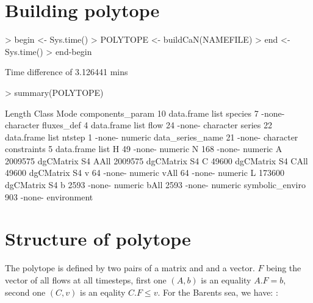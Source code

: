 \documentclass{article}
\begin{document}
\section{Building polytope}

\begin{Schunk}
\begin{Sinput}
> begin <- Sys.time()
> POLYTOPE <- buildCaN(NAMEFILE)
> end <- Sys.time()
> end-begin
\end{Sinput}
\begin{Soutput}
Time difference of 3.126441 mins
\end{Soutput}
\begin{Sinput}
> summary(POLYTOPE)
\end{Sinput}
\begin{Soutput}
                 Length  Class      Mode       
components_param      10 data.frame list       
species                7 -none-     character  
fluxes_def             4 data.frame list       
flow                  24 -none-     character  
series                22 data.frame list       
ntstep                 1 -none-     numeric    
data_series_name      21 -none-     character  
constraints            5 data.frame list       
H                     49 -none-     numeric    
N                    168 -none-     numeric    
A                2009575 dgCMatrix  S4         
AAll             2009575 dgCMatrix  S4         
C                  49600 dgCMatrix  S4         
CAll               49600 dgCMatrix  S4         
v                     64 -none-     numeric    
vAll                  64 -none-     numeric    
L                 173600 dgCMatrix  S4         
b                   2593 -none-     numeric    
bAll                2593 -none-     numeric    
symbolic_enviro      903 -none-     environment
\end{Soutput}
\end{Schunk}

\section{Structure of polytope}

The polytope is defined by two pairs of a matrix and and a vector. $F$ being the vector of all flows at all timesteps, first one $(A,b)$ is an equality $ A.F = b$, second one $(C,v)$ is an eqality  $ C.F \le v$. For the Barents sea, we have: :
\end{document}
